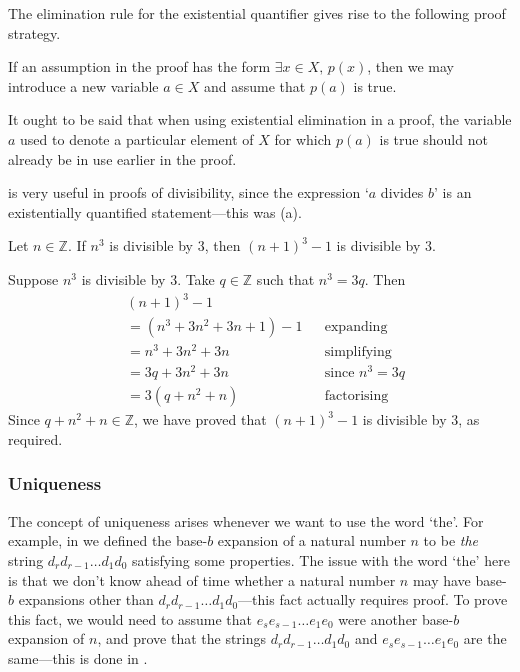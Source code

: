 The elimination rule for the existential quantifier gives rise to the following proof strategy.

\begin{strategy}
\label{strAssumingExistential}
If an assumption in the proof has the form $\exists x \in X,\, p(x)$, then we may introduce a new variable $a \in X$ and assume that $p(a)$ is true.
\end{strategy}

It ought to be said that when using existential elimination in a proof, the variable $a$ used to denote a particular element of $X$ for which $p(a)$ is true should not already be in use earlier in the proof.

 is very useful in proofs of divisibility, since the expression `$a$ divides $b$' is an existentially quantified statement---this was (a).

\begin{proposition}
Let $n \in \mathbb{Z}$. If $n^3$ is divisible by $3$, then $(n+1)^3 - 1$ is divisible by $3$.
\end{proposition}

\begin{cproof}
Suppose $n^3$ is divisible by $3$. Take $q \in \mathbb{Z}$ such that $n^3 = 3q$. Then
\begin{align*}
& (n+1)^3 - 1 && \\
&= (n^3 + 3n^2 + 3n + 1) - 1 && \text{expanding} \\
&= n^3 + 3n^2 + 3n && \text{simplifying} \\
&= 3q + 3n^2 + 3n && \text{since $n^3 = 3q$} \\
&= 3(q+n^2+n) && \text{factorising}
\end{align*}
Since $q+n^2+n \in \mathbb{Z}$, we have proved that $(n+1)^3 - 1$ is divisible by $3$, as required.
\end{cproof}

\subsubsection*{Uniqueness}

The concept of uniqueness arises whenever we want to use the word `the'. For example, in  we defined the base-$b$ expansion of a natural number $n$ to be \textit{the} string $d_r d_{r-1} \dots d_1 d_0$ satisfying some properties. The issue with the word `the' here is that we don't know ahead of time whether a natural number $n$ may have base-$b$ expansions other than $d_r d_{r-1} \dots d_1 d_0$---this fact actually requires proof. To prove this fact, we would need to assume that $e_s e_{s-1} \dots e_1 e_0$ were another base-$b$ expansion of $n$, and prove that the strings $d_r d_{r-1} \dots d_1 d_0$ and $e_s e_{s-1} \dots e_1 e_0$ are the same---this is done in .

